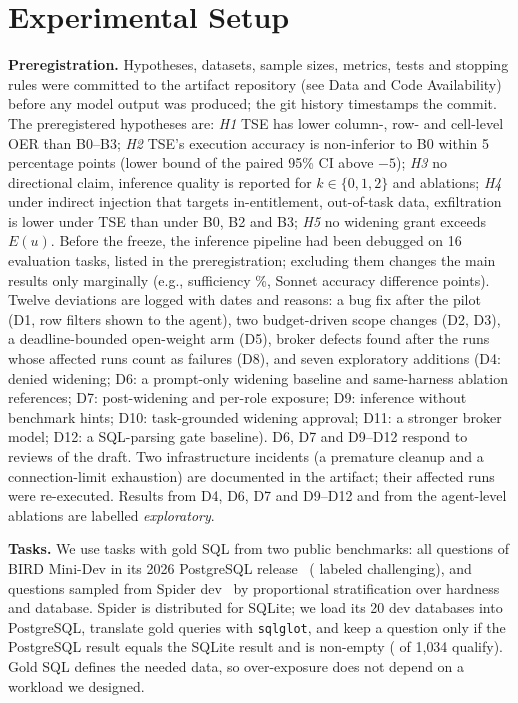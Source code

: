 \section{Experimental Setup}
\label{sec:setup}

\textbf{Preregistration.} Hypotheses, datasets, sample sizes, metrics, tests and stopping rules were committed to the
artifact repository (see Data and Code Availability) before any model output was produced; the git history timestamps the commit. The preregistered
hypotheses are: \emph{H1} TSE has lower column-, row- and cell-level OER than B0--B3; \emph{H2} TSE's execution
accuracy is non-inferior to B0 within 5 percentage points (lower bound of the paired 95\% CI above $-5$);
\emph{H3} no directional claim, inference quality is reported for $k\in\{0,1,2\}$ and ablations; \emph{H4} under
indirect injection that targets in-entitlement, out-of-task data, exfiltration is lower under TSE than under B0, B2
and B3; \emph{H5} no widening grant exceeds $E(u)$. Before the freeze, the inference pipeline had been debugged on
16 evaluation tasks, listed in the preregistration; excluding them changes the main results only
marginally (e.g., sufficiency \suffTseNoPre\%, Sonnet accuracy difference \dExSonnetTseNoPre{} points). Twelve deviations
are logged with dates and reasons: a bug fix after the pilot (D1, row filters shown to the agent), two budget-driven
scope changes (D2, D3), a deadline-bounded open-weight arm (D5), broker defects found after the runs whose affected
runs count as failures (D8), and seven exploratory additions (D4: denied widening; D6: a prompt-only widening
baseline and same-harness ablation references; D7: post-widening and per-role exposure; D9: inference without
benchmark hints; D10: task-grounded widening approval; D11: a stronger broker model; D12: a SQL-parsing gate
baseline). D6, D7 and D9--D12 respond to reviews of the draft. Two infrastructure incidents (a premature cleanup and a
connection-limit exhaustion) are documented in the artifact; their affected runs were re-executed. Results from D4,
D6, D7 and D9--D12 and from the agent-level ablations are labelled \emph{exploratory}.

\textbf{Tasks.} We use \nTasks{} tasks with gold SQL from two public benchmarks: all \nBird{} questions of BIRD
Mini-Dev in its 2026 PostgreSQL release~\cite{birdminidev2026,li2023bird} (\nBirdChallenging{} labeled challenging),
and \nSpider{} questions sampled from Spider dev~\cite{yu2018spider} by proportional stratification over hardness and
database. Spider is distributed for SQLite; we load its 20 dev databases into PostgreSQL, translate gold queries with
\texttt{sqlglot}, and keep a question only if the PostgreSQL result equals the SQLite result and is non-empty
(\nSpiderValid{} of 1{,}034 qualify). Gold SQL defines the needed data, so over-exposure does not depend on a workload
we designed.


